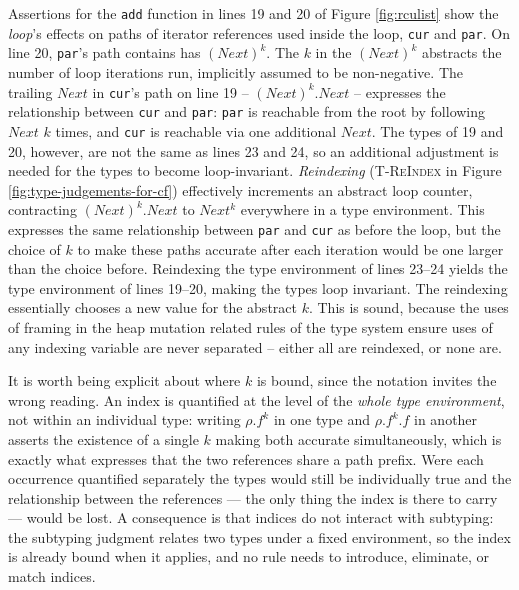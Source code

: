 Assertions for the \texttt{add} function in lines 19 and 20 of Figure \ref{fig:rculist} show the \textit{loop}'s effects on paths of iterator references used inside the loop, \texttt{cur} and \texttt{par}. 
On line 20, \texttt{par}'s path contains has $(Next)^{k}$.
The $k$ in the $(Next)^{k}$ abstracts the number of loop iterations run, implicitly assumed to be non-negative.
The trailing $Next$ in \texttt{cur}'s path on line 19 -- $(Next)^{k}.Next$ -- expresses the relationship between \texttt{cur} and \texttt{par}: \texttt{par} is reachable from the root by following $Next$ $k$ times, and \texttt{cur} is reachable via one additional $Next$.
The types of 19 and 20, however, are not the same as lines 23 and 24, so an additional adjustment is needed for the types to become loop-invariant.
\emph{Reindexing} (\textsc{T-ReIndex} in Figure \ref{fig:type-judgements-for-cf}) effectively increments an abstract loop counter, contracting $(Next)^k.Next$ to $Next^k$ everywhere in a type environment. This expresses the same relationship between \texttt{par} and \texttt{cur} as before the loop, but the choice of $k$ to make these paths accurate after each iteration would be one larger than the choice before.
Reindexing the type environment of lines 23--24 yields the type environment of lines 19--20, making the types loop invariant. The reindexing essentially chooses a new value for the abstract $k$. This is sound, because the uses of framing in the heap mutation related rules of the type system ensure uses of any indexing variable are never separated -- either all are reindexed, or none are.

It is worth being explicit about where $k$ is bound, since the notation invites the wrong reading.  An index is quantified at the level of the \emph{whole type environment}, not within an individual type: writing $\rho.f^{k}$ in one type and $\rho.f^{k}.f$ in another asserts the existence of a single $k$ making both accurate simultaneously, which is exactly what expresses that the two references share a path prefix.  Were each occurrence quantified separately the types would still be individually true and the relationship between the references --- the only thing the index is there to carry --- would be lost.  A consequence is that indices do not interact with subtyping: the subtyping judgment relates two types under a fixed environment, so the index is already bound when it applies, and no rule needs to introduce, eliminate, or match indices.

